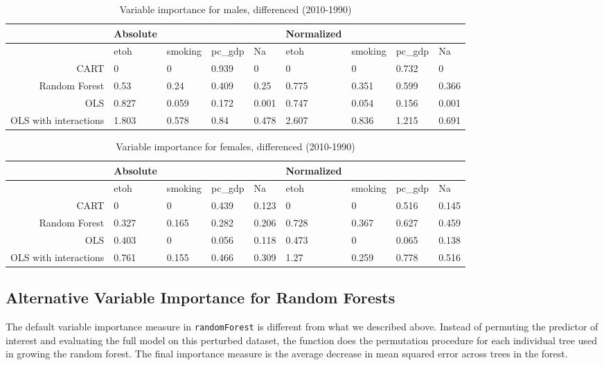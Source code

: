 \documentclass[11pt]{article}\usepackage[]{graphicx}\usepackage[]{color}
\begin{document}
 
\begin{table}[ht]
\centering
\begin{tabular}{r|llll|llll}
   \hline
 & Absolute &  &  &  & Normalized &  &  &  \\ 
   \hline
   & etoh & smoking & pc\_gdp & Na & etoh & smoking & pc\_gdp & Na \\ 
   \hline
CART & 0 & 0 & 0.939 & 0 & 0 & 0 & 0.732 & 0 \\ 
  Random Forest & 0.53 & 0.24 & 0.409 & 0.25 & 0.775 & 0.351 & 0.599 & 0.366 \\ 
  OLS & 0.827 & 0.059 & 0.172 & 0.001 & 0.747 & 0.054 & 0.156 & 0.001 \\ 
  OLS with interactions & 1.803 & 0.578 & 0.84 & 0.478 & 2.607 & 0.836 & 1.215 & 0.691 \\ 
   \hline
\end{tabular}
\caption{Variable importance for males, differenced (2010-1990)} 
\end{table}
\begin{table}[ht]
\centering
\begin{tabular}{r|llll|llll}
   \hline
 & Absolute &  &  &  & Normalized &  &  &  \\ 
   \hline
   & etoh & smoking & pc\_gdp & Na & etoh & smoking & pc\_gdp & Na \\ 
   \hline
CART & 0 & 0 & 0.439 & 0.123 & 0 & 0 & 0.516 & 0.145 \\ 
  Random Forest & 0.327 & 0.165 & 0.282 & 0.206 & 0.728 & 0.367 & 0.627 & 0.459 \\ 
  OLS & 0.403 & 0 & 0.056 & 0.118 & 0.473 & 0 & 0.065 & 0.138 \\ 
  OLS with interactions & 0.761 & 0.155 & 0.466 & 0.309 & 1.27 & 0.259 & 0.778 & 0.516 \\ 
   \hline
\end{tabular}
\caption{Variable importance for females, differenced (2010-1990)} 
\end{table}


\subsection{Alternative Variable Importance for Random Forests}
The default variable importance measure in \texttt{randomForest} is different from what we described above.
Instead of permuting the predictor of interest and evaluating the full model on this perturbed dataset, the function does the permutation procedure for each individual tree used in growing the random forest.
The final importance measure is the average decrease in mean squared error across trees in the forest.
\end{document}
